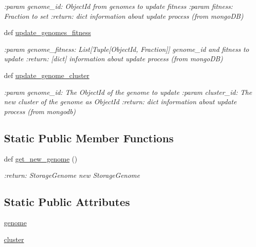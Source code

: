 \begin{DoxyCompactItemize}
\begin{DoxyCompactList}\small\item\em \+:param genome\+\_\+id\+: Object\+Id from genomes to update fitness \+:param fitness\+: Fraction to set \+:return\+: dict information about update process (from mongo\+DB) \end{DoxyCompactList}\item 
def \hyperlink{classNEAT__PyGenetics_1_1NEAT_1_1Repository_1_1GenomeRepository_1_1GenomeRepository_a6e90ef99f78be7ecddc26d8b73416116}{update\+\_\+genomes\+\_\+fitness}
\begin{DoxyCompactList}\small\item\em \+:param genome\+\_\+fitness\+: List\mbox{[}Tuple\mbox{[}Object\+Id, Fraction\mbox{]}\mbox{]} genome\+\_\+id and fitness to update \+:return\+: \mbox{[}dict\mbox{]} information about update process (from mongo\+DB) \end{DoxyCompactList}\item 
def \hyperlink{classNEAT__PyGenetics_1_1NEAT_1_1Repository_1_1GenomeRepository_1_1GenomeRepository_a1709665aff216c7567cbc079bc5135c8}{update\+\_\+genome\+\_\+cluster}
\begin{DoxyCompactList}\small\item\em \+:param genome\+\_\+id\+: The Object\+Id of the genome to update \+:param cluster\+\_\+id\+: The new cluster of the genome as Object\+Id \+:return\+: dict information about update process (from mongodb) \end{DoxyCompactList}\end{DoxyCompactItemize}
\subsection*{Static Public Member Functions}
\begin{DoxyCompactItemize}
\item 
def \hyperlink{classNEAT__PyGenetics_1_1NEAT_1_1Repository_1_1GenomeRepository_1_1GenomeRepository_a2ac10279f99269dc45fb9ed047c37fb9}{get\+\_\+new\+\_\+genome} ()
\begin{DoxyCompactList}\small\item\em \+:return\+: Storage\+Genome new Storage\+Genome \end{DoxyCompactList}\end{DoxyCompactItemize}
\subsection*{Static Public Attributes}
\begin{DoxyCompactItemize}
\item 
\hyperlink{classNEAT__PyGenetics_1_1NEAT_1_1Repository_1_1GenomeRepository_1_1GenomeRepository_a23662b9337cfca1f402b206989747f45}{genome}
\item 
\hyperlink{classNEAT__PyGenetics_1_1NEAT_1_1Repository_1_1GenomeRepository_1_1GenomeRepository_a8932d6257b6a5e28ddc6aa822585eef0}{cluster}
\end{DoxyCompactItemize}


